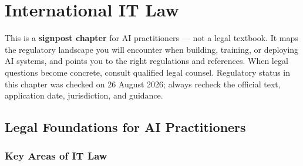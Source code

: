 \chapter{International IT Law}

\begin{tcolorbox}[skin=sectionboxskin, title=Chapter Scope]
    This is a \textbf{signpost chapter} for AI practitioners — not a legal textbook.
    It maps the regulatory landscape you will encounter when building, training, or deploying AI systems,
    and points you to the right regulations and references.
    When legal questions become concrete, consult qualified legal counsel.
    Regulatory status in this chapter was checked on 26 August 2026; always
    recheck the official text, application date, jurisdiction, and guidance.
\end{tcolorbox}

\section{Legal Foundations for AI Practitioners}

\subsection{Key Areas of IT Law}

